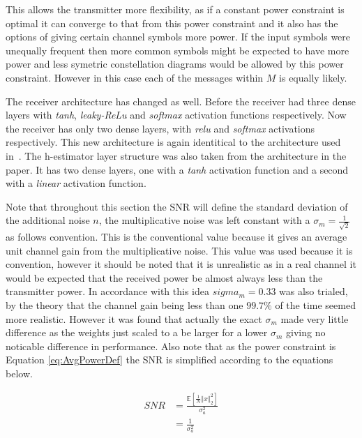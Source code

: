 \documentclass[12pt,onecolumn,letterpaper]{article}
\newcommand{\code}{\textit}
\begin{document}
This allows the transmitter more flexibility, as if a constant power constraint is optimal it can converge to that from this power constraint and it also has the options of giving certain channel symbols more power. If the input symbols were unequally frequent then more common symbols might be expected to have more power and less symetric constellation diagrams would be allowed by this power constraint. However in this case each of the messages within $M$ is equally likely. 

The receiver architecture has changed as well. Before the receiver had three dense layers with \code{tanh}, \code{leaky-ReLu} and \code{softmax} activation functions respectively. Now the receiver has only two dense layers, with \code{relu} and \code{softmax} activations respectively. This new architecture is again identitical to the architecture used in~\cite{Aoudia}. The h-estimator layer structure was also taken from the architecture in the paper. It has two dense layers, one with a \code{tanh} activation function and a second with a \code{linear} activation function. 

Note that throughout this section the SNR will define the standard deviation of the additional noise $n$, the multiplicative noise was left constant with a $\sigma_m = \frac{1}{\sqrt{2}}$ as follows convention. This is the conventional value because it gives an average unit channel gain from the multiplicative noise. This value was used because it is convention, however it should be noted that it is unrealistic as in a real channel it would be expected that the received power be almost always less than the transmitter power. In accordance with this idea $sigma_m = 0.33$ was also trialed, by the theory that the channel gain being less than one $99.7\%$ of the time seemed more realistic. However it was found that actually the exact $\sigma_m$ made very little difference as the weights just scaled to a be larger for a lower $\sigma_m$ giving no noticable difference in performance. Also note that as the power constraint is Equation \ref{eq:AvgPowerDef} the SNR is simplified according to the equations below.

\begin{align}
   SNR &= \frac{\mathbb{E}\left[\frac{1}{N}\left\Vert x\right\Vert_2^2\right]}{\sigma_a^2} \nonumber\\
   &= \frac{1}{\sigma_a^2}
   \label{eq:AoudiaSnrDef}
\end{align}
\end{document}

